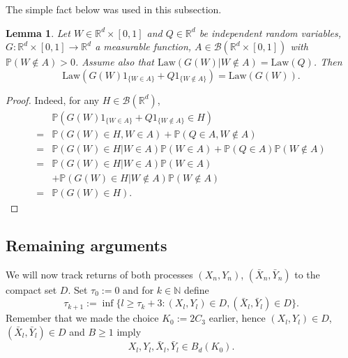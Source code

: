 \documentclass{article}
\newtheorem{lemma}[theorem]{Lemma}
\begin{document}
The simple fact below was used in this subsection.

\begin{lemma}\label{lemmacska}
Let $W\in \mathbb{R}^{d}\times [0,1]$ and $Q\in\mathbb{R}^{d}$ be independent random variables, 
$G:\mathbb{R}^{d}\times [0,1]\to\mathbb{R}^{d}$ a measurable function,
$A\in\mathcal{B}(\mathbb{R}^{d}\times [0,1])$ with $\mathbb{P}(W\notin A)>0$.
Assume also that
$\mathrm{Law}(G(W)|W\notin A)=\mathrm{Law}(Q)$. 
Then 
$$
\mathrm{Law}(G(W)1_{\{W\in A\}}+Q1_{\{W\notin A\}})=\mathrm{Law}(G(W)).
$$
\end{lemma}
\begin{proof}
Indeed, for any $H\in\mathcal{B}(\mathbb{R}^{d})$,
\begin{align*}
&\mathbb{P}(G(W)1_{\{W\in A\}}+Q1_{\{W\notin A\}}\in H)\\
=&\mathbb{P}(G(W)\in H, W\in A)+
    \mathbb{P}(Q\in A, W\notin A)\\
=&\mathbb{P}(G(W)\in H| W\in A)\mathbb{P}(W\in A) +
\mathbb{P}(Q\in A)\mathbb{P}(W\notin A)\\
=&\mathbb{P}(G(W)\in H| W\in A)\mathbb{P}(W\in A)\\
&+\mathbb{P}(G(W)\in H| W\notin A)\mathbb{P}(W\notin A)\\
=&\mathbb{P}(G(W)\in H).	
\end{align*}
\end{proof}


\subsection{Remaining arguments}\label{ra}

We will now track returns of both processes $(X_{n},Y_{n})$, $(\bar{X}_{n},\bar{Y}_{n})$ to the compact set $D$. 
Set $\tau_0:=0$ and for $k\in\mathbb{N}$ define
$$
\tau_{k+1}:=\inf\{l\geq \tau_k+3: ({X}_l,{Y}_l)\in D, 
(\bar{X}_l,\bar{Y}_l)\in D\}.
$$
Remember that we made the choice $K_{0}:=2C_{3}$ earlier, hence $({X}_l,{Y}_l)\in D$, 
$(\bar{X}_l,\bar{Y}_l)\in D$ and $B\geq 1$ imply $${X}_l,{Y}_l,\bar{X}_l,\bar{Y}_l\in B_{d}(K_{0}).$$
\end{document}
